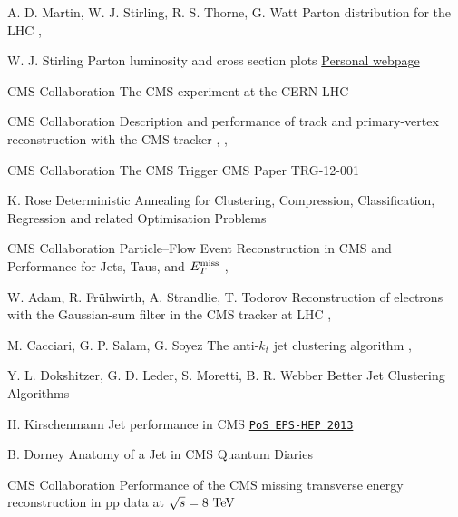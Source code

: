 {A. D. Martin, W. J. Stirling, R. S. Thorne, G. Watt}
{Parton distribution for the LHC}
{, }

{W. J. Stirling}
{Parton luminosity and cross section plots}
{\href{http://www.hep.ph.ic.ac.uk/~wstirlin/plots/plots.html}{Personal webpage}}

{CMS Collaboration}
{The CMS experiment at the CERN LHC}
{}

{CMS Collaboration}
{Description and performance of track and primary-vertex reconstruction with the CMS tracker}
{, , }

{CMS Collaboration}
{The CMS Trigger}
{CMS Paper TRG-12-001}

{K. Rose}
{Deterministic Annealing for Clustering, Compression, Classification, Regression and related Optimisation Problems}
{}

{CMS Collaboration}
{Particle–Flow Event Reconstruction in CMS and Performance for Jets, Taus, and $E_T^\text{miss}$}
{, }

{W. Adam, R. Frühwirth, A. Strandlie, T. Todorov}
{Reconstruction of electrons with the Gaussian-sum filter in the CMS tracker at LHC}
{, }

{M. Cacciari, G. P. Salam, G. Soyez}
{The anti-$k_t$ jet clustering algorithm}
{, }

{Y. L. Dokshitzer, G. D. Leder, S. Moretti, B. R. Webber}
{Better Jet Clustering Algorithms}
{ }

{H. Kirschenmann}
{Jet performance in CMS}
{\texttt{\href{http://pos.sissa.it/archive/conferences/180/433/EPS-HEP\%202013_433.pdf}{PoS EPS-HEP 2013}}}

{B. Dorney}
{Anatomy of a Jet in CMS}
{Quantum Diaries}

{CMS Collaboration}
{Performance of the CMS missing transverse energy reconstruction in pp data at $\sqrt{s} = 8~\text{TeV}$}
{ }

